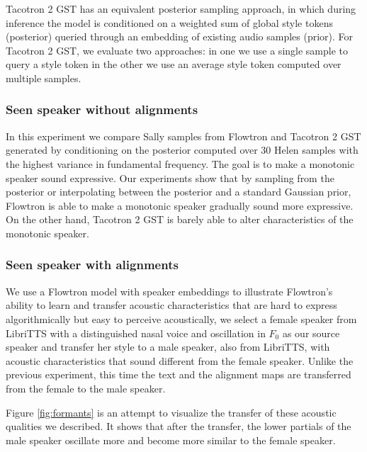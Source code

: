 \documentclass{article}
\begin{document}
Tacotron 2 GST \cite{wang2018style} has an equivalent posterior sampling approach, in which during inference the model is conditioned on a weighted sum of global style tokens (posterior) queried through an embedding of existing audio samples (prior). For Tacotron 2 GST, we evaluate two approaches: in one we use a single sample to query a style token in the other we use an average style token computed over multiple samples.

\subsubsection{Seen speaker without alignments}\label{sec:seen_noalignments}
In this experiment we compare Sally samples from Flowtron and Tacotron 2 GST generated by conditioning on the posterior computed over 30 Helen samples with the highest variance in fundamental frequency. The goal is to make a monotonic speaker sound expressive. Our experiments show that by sampling from the posterior or interpolating between the posterior and a standard Gaussian prior, Flowtron is able to make a monotonic speaker gradually sound more expressive. On the other hand, Tacotron 2 GST is barely able to alter characteristics of the monotonic speaker. 

\subsubsection{Seen speaker with alignments}\label{sec:seen_alignments}
We use a Flowtron model with speaker embeddings to illustrate Flowtron's ability to learn and transfer acoustic characteristics that are hard to express algorithmically but easy to perceive acoustically, we select a female speaker from LibriTTS with a distinguished nasal voice and oscillation in $F_0$ as our source speaker and transfer her style to a male speaker, also from LibriTTS, with acoustic characteristics that sound different from the female speaker. Unlike the previous experiment, this time the text and the alignment maps are transferred from the female to the male speaker.

Figure \ref{fig:formants} is an attempt to visualize the transfer of these acoustic qualities we described. It shows that after the transfer, the lower partials of the male speaker oscillate more and become more similar to the female speaker.
\end{document}

